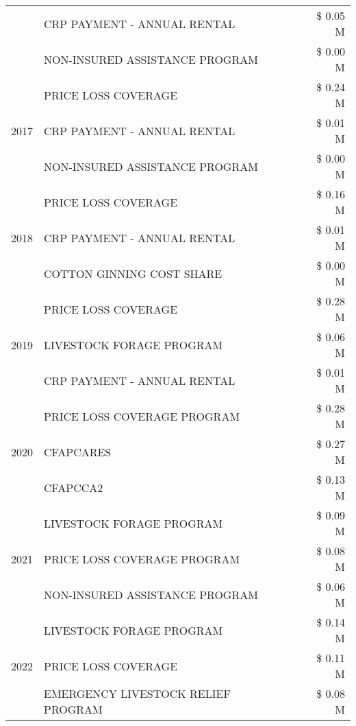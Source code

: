 \begin{tabular}{llr}
 & CRP PAYMENT - ANNUAL RENTAL & \$ 0.05 M \\
 & NON-INSURED ASSISTANCE PROGRAM & \$ 0.00 M \\
\cline{1-3}
\multirow[t]{3}{*}{2017} & PRICE LOSS COVERAGE & \$ 0.24 M \\
 & CRP PAYMENT - ANNUAL RENTAL & \$ 0.01 M \\
 & NON-INSURED ASSISTANCE PROGRAM & \$ 0.00 M \\
\cline{1-3}
\multirow[t]{3}{*}{2018} & PRICE LOSS COVERAGE & \$ 0.16 M \\
 & CRP PAYMENT - ANNUAL RENTAL & \$ 0.01 M \\
 & COTTON GINNING COST SHARE & \$ 0.00 M \\
\cline{1-3}
\multirow[t]{3}{*}{2019} & PRICE LOSS COVERAGE & \$ 0.28 M \\
 & LIVESTOCK FORAGE PROGRAM & \$ 0.06 M \\
 & CRP PAYMENT - ANNUAL RENTAL & \$ 0.01 M \\
\cline{1-3}
\multirow[t]{3}{*}{2020} & PRICE LOSS COVERAGE PROGRAM & \$ 0.28 M \\
 & CFAPCARES & \$ 0.27 M \\
 & CFAPCCA2 & \$ 0.13 M \\
\cline{1-3}
\multirow[t]{3}{*}{2021} & LIVESTOCK FORAGE PROGRAM & \$ 0.09 M \\
 & PRICE LOSS COVERAGE PROGRAM & \$ 0.08 M \\
 & NON-INSURED ASSISTANCE PROGRAM & \$ 0.06 M \\
\cline{1-3}
\multirow[t]{3}{*}{2022} & LIVESTOCK FORAGE PROGRAM & \$ 0.14 M \\
 & PRICE LOSS COVERAGE & \$ 0.11 M \\
 & EMERGENCY LIVESTOCK RELIEF PROGRAM & \$ 0.08 M \\
\cline{1-3}
\bottomrule
\end{tabular}
